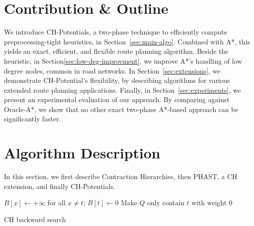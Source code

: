 \documentclass[a4paper,USenglish,cleveref, autoref, thm-restate]{lipics-v2019}
\begin{document}
\section{Contribution \& Outline}

We introduce CH-Potentials, a two-phase technique to efficiently compute preprocessing-tight heuristics, in Section~\ref{sec:main-algo}.
Combined with A*, this yields an exact, efficient, and flexible route planning algorithm.
Beside the heuristic, in Section\ref{sec:low-deg-improvment}, we improve A*'s handling of low degree nodes, common in road networks.
In Section~\ref{sec:extensions}, we demonstrate CH-Potential's flexibility, by describing algorithms for various extended route planning applications.
Finally, in Section~\ref{sec:experiments}, we present an experimental evaluation of our approach.
By comparing against Oracle-A*, we show that no other exact two-phase A*-based approach can be significantly faster.

\section{Algorithm Description}

In this section, we first describe Contraction Hierarchies, then PHAST, a CH extension, and finally CH-Potentials.

\label{sec:main-algo}

\begin{algorithm2e}
$B[x] \leftarrow +\infty$ for all $x\neq t$;
$B[t] \leftarrow 0$\;
Make $Q$ only contain $t$ with weight $0$\;
\caption{CH backward search}
\label{algo:ch-backward}
\end{algorithm2e}
\end{document}
